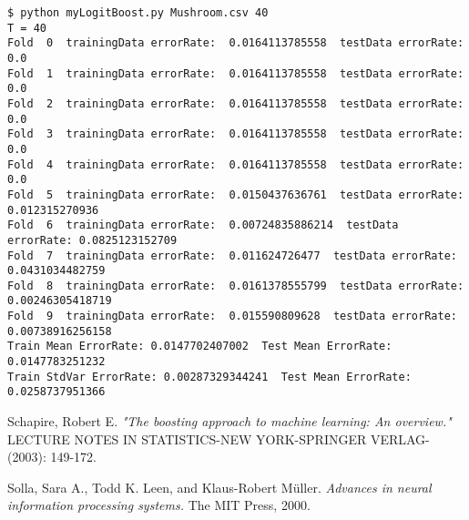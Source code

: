 \documentclass[12pt]{amsart}
\begin{document}
\begin{verbatim}
$ python myLogitBoost.py Mushroom.csv 40
T = 40
Fold  0  trainingData errorRate:  0.0164113785558  testData errorRate: 0.0
Fold  1  trainingData errorRate:  0.0164113785558  testData errorRate: 0.0
Fold  2  trainingData errorRate:  0.0164113785558  testData errorRate: 0.0
Fold  3  trainingData errorRate:  0.0164113785558  testData errorRate: 0.0
Fold  4  trainingData errorRate:  0.0164113785558  testData errorRate: 0.0
Fold  5  trainingData errorRate:  0.0150437636761  testData errorRate: 0.012315270936
Fold  6  trainingData errorRate:  0.00724835886214  testData errorRate: 0.0825123152709
Fold  7  trainingData errorRate:  0.011624726477  testData errorRate: 0.0431034482759
Fold  8  trainingData errorRate:  0.0161378555799  testData errorRate: 0.00246305418719
Fold  9  trainingData errorRate:  0.015590809628  testData errorRate: 0.00738916256158
Train Mean ErrorRate: 0.0147702407002  Test Mean ErrorRate: 0.0147783251232
Train StdVar ErrorRate: 0.00287329344241  Test Mean ErrorRate: 0.0258737951366
\end{verbatim}

\begin{thebibliography}{10}

 Schapire, Robert E. \textit{"The boosting approach to machine learning: An overview."} LECTURE NOTES IN STATISTICS-NEW YORK-SPRINGER VERLAG- (2003): 149-172.

 Solla, Sara A., Todd K. Leen, and Klaus-Robert Müller.\textit{ Advances in neural information processing systems.} The MIT Press, 2000.

\end{thebibliography}
\end{document}
